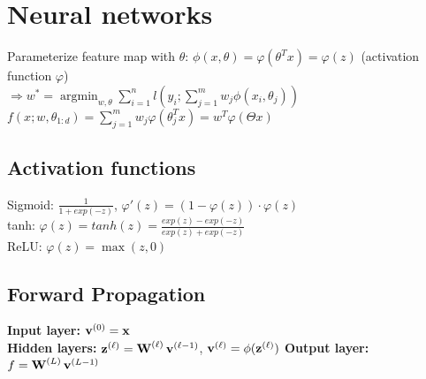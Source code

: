 \section*{Neural networks}
Parameterize feature map with $\theta$: $\phi(x,\theta) = \varphi(\theta^T x) = \varphi(z)$ (activation function $\varphi$)\\
$\Rightarrow w^* = {\operatorname{argmin}_{w, \theta}} \sum_{i=1}^n l(y_i; \sum_{j=1}^m w_j \phi(x_i, \theta_j))$\\
$f(x; w, \theta_{1:d}) = \sum_{j=1}^m w_j \varphi(\theta_j^T x) = w^T \varphi(\Theta x)$

\subsection*{Activation functions}
Sigmoid: $\frac{1}{1+exp(-z)}$,  $\varphi'(z) = (1 - \varphi(z))\cdot\varphi(z)$\\
tanh: $\varphi(z) = tanh(z) = \frac{exp(z)-exp(-z)}{exp(z)+exp(-z)}$\\
ReLU:  $\varphi(z) = \max(z,0)$

\begin{comment}
\subsection*{Predict: forward propagation}
$v^{(0)} = x$ (\textit{input}); for $l = 1,...,L-1$: \\
$v^{(l)} = \varphi(z^{(l)})$, $z^{(l)} = W^{(l)}v^{(l-1)}$ (\textit{hidden})\\
$f = W^{(L)}v^{(L-1)}$ (\textit{output})\\
Predict $f$ for regression, $\operatorname{sign}(f)$ for class.

\subsection*{Compute gradient: backpropagation}
Output layer: 
$\delta_j = l_j'(f_j)$,
$\frac{\partial}{\partial w_{j,i}} = \delta_j v_i$\\
Hidden layer $l=L-1,...,1$:\\
$\delta_j = \varphi'(z_j) \cdot \sum_{i\in Layer_{l+1}} w_{i,j}\delta_i$,
$\frac{\partial}{\partial w_{j,i}} = \delta_j v_i$
\end{comment}

\subsection*{Forward Propagation}
\textbf{Input layer:} $\operatorname*{\mathbf{v}}^{(0)}=\operatorname*{\mathbf{x}}$ \\
\textbf{Hidden layers:} $\operatorname*{\mathbf{z}}^{(\ell)}=\operatorname*{\mathbf{W}}^{(\ell)}\operatorname*{\mathbf{v}}^{(\ell-1)}$, $\operatorname*{\mathbf{v}}^{(\ell)}=\phi(\operatorname*{\mathbf{z}}^{(\ell)})$
\textbf{Output layer:} $f=\operatorname*{\mathbf{W}}^{(L)}\operatorname*{\mathbf{v}}^{(L-1)}$

